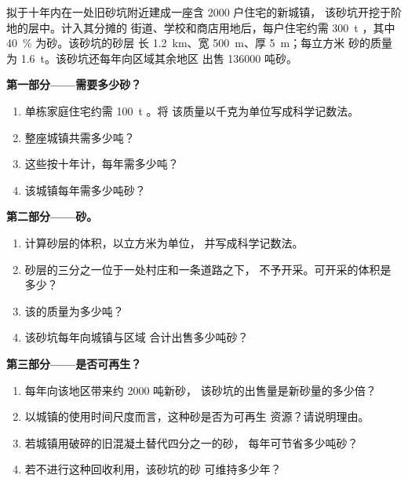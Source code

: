 \begin{problem}
\label{pb:g9:earth-resources:1}
拟于十年内在一处旧砂坑附近建成一座含 \num{2000} 户住宅的新城镇，
该砂坑开挖于阶地的层中。计入其分摊的
街道、学校和商店用地后，每户住宅约需 \qty{300}{t} ，其中
\qty{40}{\%} 为砂。该砂坑的砂层
长 \qty{1.2}{km}、宽 \qty{500}{m}、厚 \qty{5}{m}；每立方米
砂的质量为 \qty{1.6}{t}。该砂坑还每年向区域其余地区
出售 \num{136000} 吨砂。

\noindent\textbf{第一部分——需要多少砂？}\par\nopagebreak
\begin{enumerate}[beginpenalty=10000]
  \item 单栋家庭住宅约需 \qty{100}{t} 。将
        该质量以千克为单位写成科学记数法。
  \item 整座城镇共需多少吨？
  \item 这些按十年计，每年需多少吨？
  \item 该城镇每年需多少吨砂？
\end{enumerate}

\noindent\textbf{第二部分——砂。}\par\nopagebreak
\begin{enumerate}[resume, beginpenalty=10000]
  \item 计算砂层的体积，以立方米为单位，
        并写成科学记数法。
  \item 砂层的三分之一位于一处村庄和一条道路之下，
        不予开采。可开采的体积是多少？
  \item 该的质量为多少吨？
  \item 该砂坑每年向城镇与区域
        合计出售多少吨砂？
\end{enumerate}

\noindent\textbf{第三部分——是否可再生？}\par\nopagebreak
\begin{enumerate}[resume, beginpenalty=10000]
  \item 每年向该地区带来约 \num{2000} 吨新砂，
        该砂坑的出售量是新砂量的多少倍？
  \item 以城镇的使用时间尺度而言，这种砂是否为可再生
        资源？请说明理由。
  \item 若城镇用破碎的旧混凝土替代四分之一的砂，
        每年可节省多少吨砂？
  \item 若不进行这种回收利用，该砂坑的砂
        可维持多少年？
\end{enumerate}
\end{problem}
